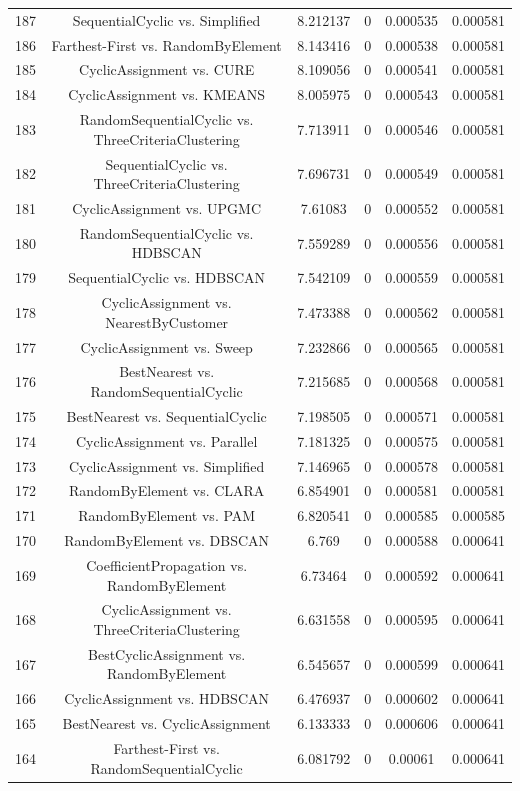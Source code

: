 \documentclass[a4paper,10pt]{article}
\begin{document}
\begin{landscape}
\begin{table}[!htp]
\begin{tabular}{cccccc}
187&SequentialCyclic vs. Simplified&8.212137&0&0.000535&0.000581\\
186&Farthest-First vs. RandomByElement&8.143416&0&0.000538&0.000581\\
185&CyclicAssignment vs. CURE&8.109056&0&0.000541&0.000581\\
184&CyclicAssignment vs. KMEANS&8.005975&0&0.000543&0.000581\\
183&RandomSequentialCyclic vs. ThreeCriteriaClustering&7.713911&0&0.000546&0.000581\\
182&SequentialCyclic vs. ThreeCriteriaClustering&7.696731&0&0.000549&0.000581\\
181&CyclicAssignment vs. UPGMC&7.61083&0&0.000552&0.000581\\
180&RandomSequentialCyclic vs. HDBSCAN&7.559289&0&0.000556&0.000581\\
179&SequentialCyclic vs. HDBSCAN&7.542109&0&0.000559&0.000581\\
178&CyclicAssignment vs. NearestByCustomer&7.473388&0&0.000562&0.000581\\
177&CyclicAssignment vs. Sweep&7.232866&0&0.000565&0.000581\\
176&BestNearest vs. RandomSequentialCyclic&7.215685&0&0.000568&0.000581\\
175&BestNearest vs. SequentialCyclic&7.198505&0&0.000571&0.000581\\
174&CyclicAssignment vs. Parallel&7.181325&0&0.000575&0.000581\\
173&CyclicAssignment vs. Simplified&7.146965&0&0.000578&0.000581\\
172&RandomByElement vs. CLARA&6.854901&0&0.000581&0.000581\\
171&RandomByElement vs. PAM&6.820541&0&0.000585&0.000585\\
170&RandomByElement vs. DBSCAN&6.769&0&0.000588&0.000641\\
169&CoefficientPropagation vs. RandomByElement&6.73464&0&0.000592&0.000641\\
168&CyclicAssignment vs. ThreeCriteriaClustering&6.631558&0&0.000595&0.000641\\
167&BestCyclicAssignment vs. RandomByElement&6.545657&0&0.000599&0.000641\\
166&CyclicAssignment vs. HDBSCAN&6.476937&0&0.000602&0.000641\\
165&BestNearest vs. CyclicAssignment&6.133333&0&0.000606&0.000641\\
164&Farthest-First vs. RandomSequentialCyclic&6.081792&0&0.00061&0.000641\\

\end{tabular}
\end{table}
\end{landscape}
\end{document}
